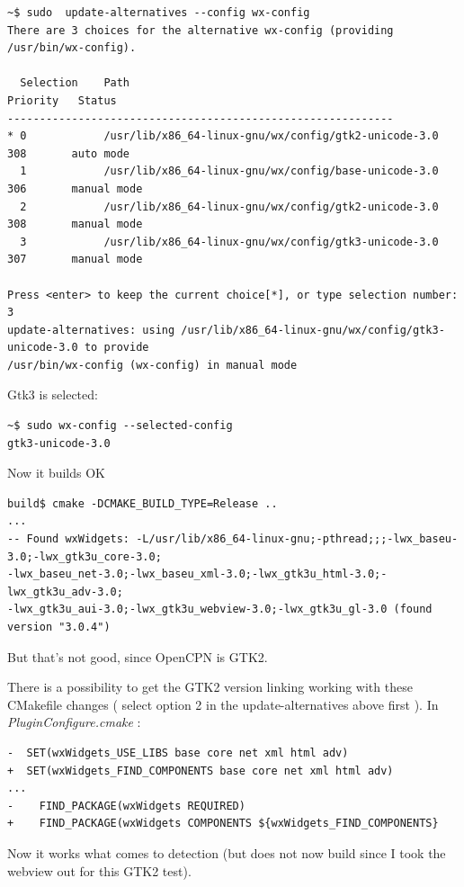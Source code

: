 \documentclass[11pt]{article}
\begin{document}
    \begin{verbatim}
~$ sudo  update-alternatives --config wx-config
There are 3 choices for the alternative wx-config (providing /usr/bin/wx-config).

  Selection    Path                                                  Priority   Status
------------------------------------------------------------
* 0            /usr/lib/x86_64-linux-gnu/wx/config/gtk2-unicode-3.0   308       auto mode
  1            /usr/lib/x86_64-linux-gnu/wx/config/base-unicode-3.0   306       manual mode
  2            /usr/lib/x86_64-linux-gnu/wx/config/gtk2-unicode-3.0   308       manual mode
  3            /usr/lib/x86_64-linux-gnu/wx/config/gtk3-unicode-3.0   307       manual mode

Press <enter> to keep the current choice[*], or type selection number: 3
update-alternatives: using /usr/lib/x86_64-linux-gnu/wx/config/gtk3-unicode-3.0 to provide
/usr/bin/wx-config (wx-config) in manual mode
\end{verbatim}

    Gtk3 is selected:

    \begin{verbatim}
~$ sudo wx-config --selected-config
gtk3-unicode-3.0
\end{verbatim}

    Now it builds OK

    \begin{verbatim}
build$ cmake -DCMAKE_BUILD_TYPE=Release ..
...
-- Found wxWidgets: -L/usr/lib/x86_64-linux-gnu;-pthread;;;-lwx_baseu-3.0;-lwx_gtk3u_core-3.0;
-lwx_baseu_net-3.0;-lwx_baseu_xml-3.0;-lwx_gtk3u_html-3.0;-lwx_gtk3u_adv-3.0;
-lwx_gtk3u_aui-3.0;-lwx_gtk3u_webview-3.0;-lwx_gtk3u_gl-3.0 (found version "3.0.4")
\end{verbatim}

    But that's not good, since OpenCPN is GTK2.

    There is a possibility to get the GTK2 version linking working with
these CMakefile changes ( select option 2 in the update-alternatives
above first ). In \emph{PluginConfigure.cmake} :

    \begin{verbatim}
-  SET(wxWidgets_USE_LIBS base core net xml html adv)
+  SET(wxWidgets_FIND_COMPONENTS base core net xml html adv)
...
-    FIND_PACKAGE(wxWidgets REQUIRED)
+    FIND_PACKAGE(wxWidgets COMPONENTS ${wxWidgets_FIND_COMPONENTS}
\end{verbatim}

    Now it works what comes to detection (but does not now build since I
took the webview out for this GTK2 test).
\end{document}
